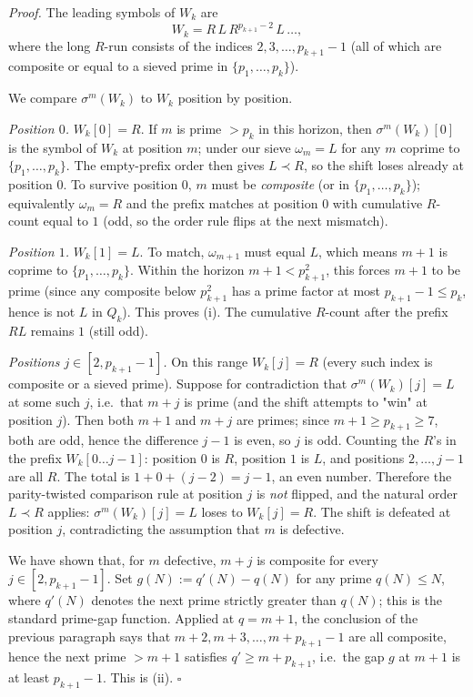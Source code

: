 \documentclass[cupthm,crop,info]{CUP-JNL-ETS}
\theoremstyle{cupplain}
\theoremstyle{cupdefinition}
\theoremstyle{cupremark}
\providecommand{\qed}{\hfill\(\square\)}
\newenvironment{proof}{\par\noindent\textit{Proof.}\quad}{\qed\par\medskip}
\numberwithin{equation}{section}
\begin{document}
\begin{proof}
The leading symbols of $W_k$ are
\[
    W_k = R\, L\, R^{p_{k+1} - 2}\, L\, \ldots,
\]
where the long $R$-run consists of the indices $2, 3, \ldots, p_{k+1} - 1$
(all of which are composite or equal to a sieved prime in $\{p_1, \ldots, p_k\}$).

We compare $\sigma^m(W_k)$ to $W_k$ position by position.

\emph{Position $0$.} $W_k[0] = R$. If $m$ is prime $> p_k$ in this
horizon, then $\sigma^m(W_k)[0]$ is the symbol of $W_k$ at position $m$;
under our sieve $\omega_m = L$ for any $m$ coprime to $\{p_1, \ldots, p_k\}$.
The empty-prefix order then gives $L \prec R$, so the shift loses
already at position $0$. To survive position $0$, $m$ must be
\emph{composite} (or in $\{p_1, \ldots, p_k\}$); equivalently
$\omega_m = R$ and the prefix matches at position $0$ with cumulative
$R$-count equal to $1$ (odd, so the order rule flips at the next
mismatch).

\emph{Position $1$.} $W_k[1] = L$. To match, $\omega_{m+1}$ must equal
$L$, which means $m + 1$ is coprime to $\{p_1, \ldots, p_k\}$. Within
the horizon $m + 1 < p_{k+1}^2$, this forces $m + 1$ to be prime (since
any composite below $p_{k+1}^2$ has a prime factor at most
$p_{k+1} - 1 \leq p_k$, hence is not $L$ in $Q_k$). This proves (i).
The cumulative $R$-count after the prefix $RL$ remains $1$ (still odd).

\emph{Positions $j \in [2, p_{k+1} - 1]$.} On this range $W_k[j] = R$
(every such index is composite or a sieved prime). Suppose for
contradiction that $\sigma^m(W_k)[j] = L$ at some such $j$, i.e.\ that
$m + j$ is prime (and the shift attempts to "win" at position $j$).
Then both $m + 1$ and $m + j$ are primes; since $m + 1 \geq p_{k+1} \geq 7$,
both are odd, hence the difference $j - 1$ is even, so $j$ is odd.
Counting the $R$'s in the prefix $W_k[0\ldots j-1]$: position $0$ is
$R$, position $1$ is $L$, and positions $2, \ldots, j-1$ are all $R$.
The total is $1 + 0 + (j - 2) = j - 1$, an even number. Therefore the
parity-twisted comparison rule at position $j$ is \emph{not} flipped,
and the natural order $L \prec R$ applies: $\sigma^m(W_k)[j] = L$ loses
to $W_k[j] = R$. The shift is defeated at position $j$, contradicting
the assumption that $m$ is defective.

We have shown that, for $m$ defective, $m + j$ is composite for every
$j \in [2, p_{k+1} - 1]$. Set $g(N) := q'(N) - q(N)$ for any prime
$q(N) \leq N$, where $q'(N)$ denotes the next prime strictly greater
than $q(N)$; this is the standard prime-gap function. Applied at
$q = m + 1$, the conclusion of the previous paragraph says that
$m + 2, m + 3, \ldots, m + p_{k+1} - 1$ are all composite, hence the
next prime $> m + 1$ satisfies $q' \geq m + p_{k+1}$, i.e.\ the gap
$g$ at $m + 1$ is at least $p_{k+1} - 1$. This is (ii).
\end{proof}
\end{document}
